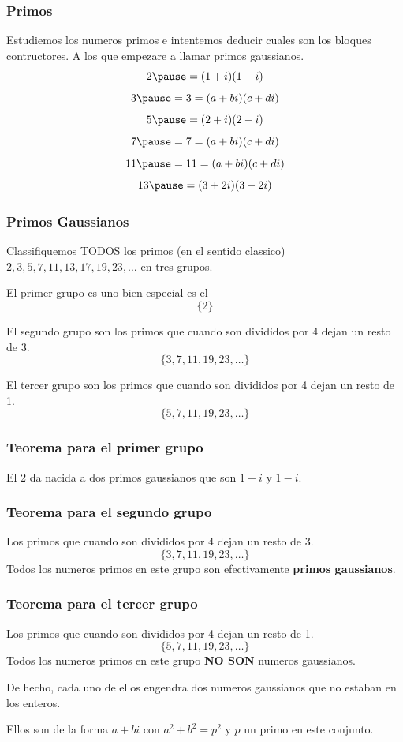 \documentclass{beamer}
\theoremstyle{thmstyle}
\theoremstyle{thmstyle}
\theoremstyle{thmstyle}
\theoremstyle{mystyle}
\theoremstyle{qstnstyle}
\begin{document}
\begin{frame}
\frametitle{Primos}
Estudiemos los numeros primos e intentemos deducir cuales son los bloques contructores. A los que empezare a llamar primos gaussianos.
$$2\pause =(1+i)(1-i) $$
\pause
$$3\pause =3=(a+bi)(c+di) $$
\pause
$$5\pause =(2+i)(2-i) $$
\pause
$$7\pause =7=(a+bi)(c+di) $$
\pause
$$11\pause =11=(a+bi)(c+di) $$
\pause
$$13\pause =(3+2i)(3-2i) $$
\end{frame}




\begin{frame}
\frametitle{Primos Gaussianos}
Classifiquemos TODOS los primos (en el sentido classico) $2, 3, 5, 7, 11, 13, 17, 19, 23,\ldots$ en tres grupos.

\pause
El primer grupo es uno bien especial es el
$$\{2\}$$

\pause
El segundo grupo son los primos que cuando son divididos por 4 dejan un resto de 3.
$$\{3,7,11,19,23,\ldots\}$$

\pause
El tercer grupo son los primos que cuando son divididos por 4 dejan un resto de 1.
$$\{5,7,11,19,23,\ldots\}$$
\end{frame}


\begin{frame}
\frametitle{Teorema para el primer grupo}
\begin{theorem}
El 2 da nacida a dos primos gaussianos que son $1+i$ y $1-i$.
\end{theorem}

\end{frame}

\begin{frame}
\frametitle{Teorema para el segundo grupo}
\begin{theorem}
Los primos que cuando son divididos por 4 dejan un resto de 3.
$$\{3,7,11,19,23,\ldots\}$$
Todos los numeros primos en este grupo son efectivamente \textbf{primos gaussianos}.
\end{theorem}
\end{frame}

\begin{frame}
\frametitle{Teorema para el tercer grupo}
\begin{theorem}
Los primos que cuando son divididos por 4 dejan un resto de 1.
$$\{5,7,11,19,23,\ldots\}$$
Todos los numeros primos en este grupo \textbf{NO SON} numeros gaussianos.

\pause 
De hecho, cada uno de ellos engendra dos numeros gaussianos que no estaban en los enteros. 

Ellos son de la forma $a+bi$ con $a^2+b^2=p^2$ y $p$ un primo en este conjunto.
\end{theorem}


\end{frame}
\end{document}
